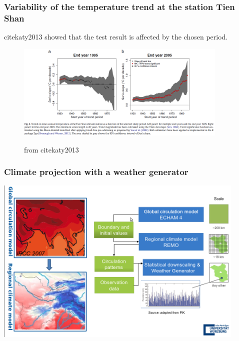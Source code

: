 \documentclass[xcolor=table, xcolor=dvipsnames]{beamer}\usepackage[]{graphicx}\usepackage[]{color}
\begin{document}
\begin{frame}\frametitle{Variability of the temperature trend at the station Tien Shan}
cite{katy2013} showed that the test result is affected by the chosen period.
\begin{figure}[H]
\includegraphics[width=0.9\textwidth]{externalfig/Trend_TienShan_katy2013.png}\\
\begin{flushright}\tiny{from cite{katy2013}}\end{flushright} %
\end{figure}
\end{frame}


\begin{frame}[fragile]\frametitle{Climate projection with a weather generator}
\includegraphics[width=0.9\textwidth]{./externalfig/remo_screenshot}
\end{frame}

\end{document}
